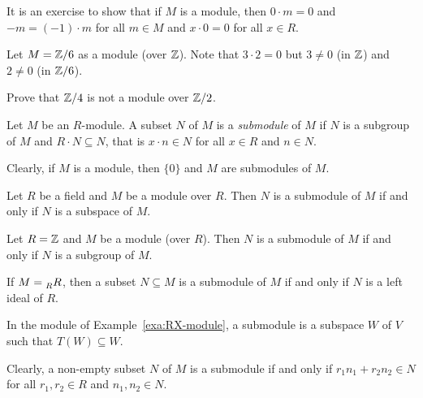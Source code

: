 It is an exercise to show that if $M$ is a module, then $0\cdot m=0$ and
$-m=(-1)\cdot m$ for all $m\in M$ and $x\cdot 0=0$ for all $x\in R$. 

\begin{example}
Let $M=\mathbb{Z}/6$ as a module (over $\mathbb{Z}$). Note that 
$3\cdot 2=0$ but $3\ne 0$ (in $\mathbb{Z}$) and $2\ne 0$ (in $\mathbb{Z}/6$).  
\end{example}

\begin{exercise}
	\label{xca:Z4overZ2}
	Prove that $\mathbb{Z}/4$ is not a module over $\mathbb{Z}/2$. 
\end{exercise}

\begin{definition}
	Let $M$ be an $R$-module. A subset $N$ of $M$ is a \emph{submodule} of $M$ if 
	$N$ is a subgroup of $M$ and $R\cdot N\subseteq N$, that is 
	$x\cdot n\in N$ for all $x\in R$ and $n\in N$. 
\end{definition}

Clearly, if $M$ is a module, then $\{0\}$ and $M$ are submodules of $M$. 

\begin{example}
Let $R$ be a field and $M$ be a module over $R$. Then
$N$ is a submodule of $M$ if and only if $N$ is a subspace of $M$. 
\end{example}

\begin{example}
Let $R=\mathbb{Z}$ and $M$ be a module (over $R$). Then
$N$ is a submodule of $M$ if and only if $N$ is a subgroup of $M$.
\end{example}

\begin{example}
If $M=\prescript{}{R}R$, then a subset $N\subseteq M$ is a submodule
of $M$ if and only if $N$ is a left ideal of $R$. 
\end{example}

\begin{example}
In the module of Example~\ref{exa:RX-module}, 
a submodule is a subspace $W$ 
of $V$ such that $T(W)\subseteq W$. 
\end{example}

Clearly, a non-empty subset $N$ of $M$ is a submodule if and only 
if $r_1n_1+r_2n_2\in N$ for all
$r_1,r_2\in R$ and $n_1,n_2\in N$. 	

